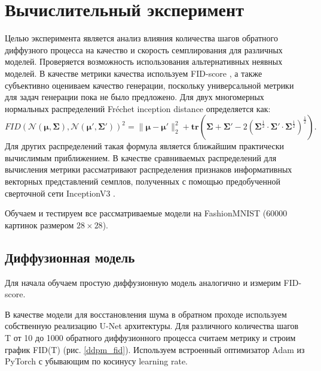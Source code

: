 \documentclass{article}
\begin{document}
 \section{Вычислительный эксперимент}
Целью эксперимента является анализ влияния количества шагов обратного диффузного процесса на качество и скорость семплирования для различных моделей. Проверяется возможность использования альтернативных неявных моделей. В качестве метрики качества используем FID-score \cite{https://doi.org/10.48550/arxiv.1706.08500}, а также субъективно оцениваем качество генерации, поскольку универсальной метрики для задач генерации пока не было предложено. Для двух многомерных нормальных распределений Fréchet inception distance определяется как:
 \begin{equation}
	FID({\mathcal {N}}(\mathbf{\mu},\mathbf{\Sigma}),{\mathcal {N}}(\mathbf{\mu} ',\mathbf{\Sigma} '))^{2}=\lVert \mathbf{\mu} -\mathbf{\mu} '\rVert _{2}^{2}+\mathbf{tr} \left(\mathbf{\Sigma} +\mathbf{\Sigma} '-2\left(\mathbf{\Sigma} ^{\frac {1}{2}}\cdot \mathbf{\Sigma} '\cdot \mathbf{\Sigma} ^{\frac {1}{2}}\right)^{\frac {1}{2}}\right).
\end{equation}
Для других распределений такая формула является ближайшим практически вычислимым приближением. В качестве сравниваемых распределений для вычисления метрики рассматривают распределения признаков информативных векторных представлений семплов, полученных с помощью предобученной сверточной сети InceptionV3 \cite{szegedy2015rethinking}.

 Обучаем и тестируем все рассматриваемые модели на FashionMNIST \cite{xiao2017fashionmnist} (60000 картинок размером $28\times 28$).


\subsection{Диффузионная модель}
Для начала обучаем простую диффузионную модель аналогично \cite{https://doi.org/10.48550/arxiv.2006.11239} и измерим FID-score.

В качестве модели для восстановления шума в обратном проходе используем собственную реализацию U-Net архитектуры. Для различного количества шагов T от 10 до 1000 обратного диффузионного процесса считаем метрику и строим график  FID(T) (рис. \ref{ddpm_fid}). Используем встроенный оптимизатор Adam из PyTorch с убывающим по косинусу learning rate.
\end{document}
